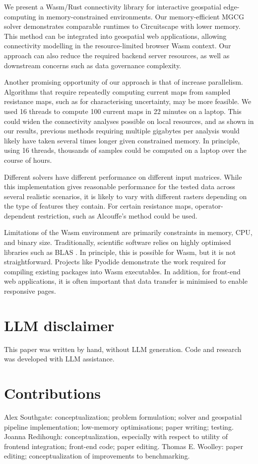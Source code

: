 \documentclass[11pt, a4paper]{article}
\begin{document}
We present a Wasm/Rust connectivity library for interactive geospatial edge-computing in memory-constrained environments.
Our memory-efficient MGCG solver demonstrates comparable 
runtimes to Circuitscape with lower memory.
This method can be integrated into geospatial web applications,
allowing connectivity modelling in the resource-limited browser Wasm context.
Our approach can also reduce the required backend server resources, as well as downstream concerns such as data governance complexity.

Another promising opportunity of our approach is that of increase parallelism. Algorithms that require repeatedly computing current maps from
sampled resistance maps, such as for characterising uncertainty, may be more feasible. We used 16 threads to compute
100 current maps in 22 minutes on a laptop. 
This could widen the connectivity analyses possible on local resources, and as shown in our results, previous methods requiring
multiple gigabytes per analysis would likely have taken several times longer given constrained memory. In principle, using
16 threads, thousands of samples could be computed on a laptop over the course of hours.

Different solvers have different performance on different input matrices. While this implementation gives reasonable performance for the
tested data across several realistic scenarios, it is likely to vary with different rasters depending on the type of features they contain.
For certain resistance maps, operator-dependent restriction, such as Alcouffe's method \cite{alcouffe2001parallel} could be used.

Limitations of the Wasm environment are primarily constraints in memory, CPU, and binary size. Traditionally, scientific software relies on 
highly optimised libraries such as BLAS \cite{blackford2002updated}. In principle, this is possible for Wasm, but it is not straightforward.
Projects like Pyodide \cite{pyodide2026} demonstrate the work required for compiling existing packages into Wasm executables. 
In addition, for front-end web applications, it is often important that data transfer is minimised to enable responsive pages.

\section{LLM disclaimer}

This paper was written by hand, without LLM generation. Code and research was developed with LLM assistance.

\section{Contributions}

Alex Southgate: conceptualization; problem formulation; solver and geospatial pipeline implementation; low-memory optimisations; paper writing; testing. Joanna Redihough: conceptualization, especially
with respect to utility of frontend integration; front-end code; paper editing.
Thomas E. Woolley: paper editing; conceptualization of improvements to benchmarking.


 
\end{document}
